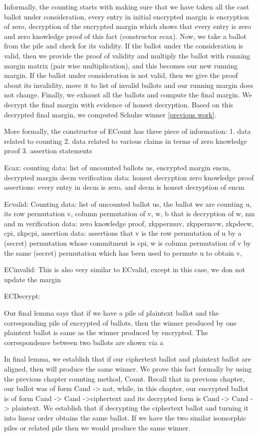 Informally, the counting starts with making sure that we have taken all the cast ballot under consideration, every entry 
in initial encrypted margin is encryption of zero, decryption of the encrypted margin which shows that every entry is zero and 
zero knowledge proof of this fact (constructor ecax).  Now, we take a ballot from the pile and check for its validity.  
If the ballot under the consideration is valid, then we provide the proof of validity and multiply the ballot with 
running margin matrix (pair wise multiplication), and this becomes our new running margin. If the ballot under consideration is 
not valid, then we 
give the proof about its invalidity, move it to list of invalid ballots and our running margin does not change. 
Finally, we exhaust all the ballots and compute the final margin. We decrypt the final margin with evidence of 
honest decryption. Based on this decrypted final margin, we computed Schulze winner \ref{previous work}. 

More formally, the constructor of ECount has three piece of information:
1. data related to counting 
2. data related to various claims in terms of zero knowledge proof
3. assertion statements 

Ecax:
counting data: list of uncounted ballots us, encrypted margin encm, decrypted margin decm 
verification data: honest decryption zero knowledge proof
assertions: every entry in decm is zero, and decm is honest decryption of encm

Ecvalid: 
Counting data: list of uncounted ballot us, the ballot we are counting u, its row permutation v, column permutation of 
v, w, b that is decryption of w, nm and m
verification data: zero knowledge proof, zkppermuv, zkppermvw, zkpdecw, cpi, zkpcpi, 
assertion data: assertions that v is the row permutation of u by a (secret) permutation whose commitment is 
cpi, w is column permutation of v by the same (secret) permutation which has been used to permute u to obtain v, 

ECinvalid: 
This is also very similar to ECvalid, except in this case, we don not update the margin

ECDecrypt: 


Our final lemma says that if we have a pile of plaintext ballot and the corresponding pile of encrypted 
of ballots, then the winner produced by one plaintext ballot is same as the winner produced by 
encrypted. The correspondence between two ballots are shown via a 


In final lemma, we establish that if our ciphertext ballot and plaintext ballot are aligned, then will produce the 
same winner. We prove this fact formally by using the previous chapter counting method, Count. Recall that 
in previous chapter, our ballot was of form Cand -> nat, while, in this chapter, our encrypted ballot is 
of form Cand -> Cand ->ciphertext and its decrypted form is Cand -> Cand -> plaintext. We establish 
that if decrypting the ciphertext ballot and turning it into  linear order obtains the same ballot. If we have 
the two similar isomorphic piles or related pile then we would produce the same winner. 


